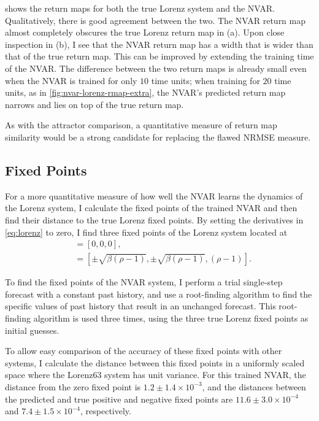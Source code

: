  shows the return maps for both the true
Lorenz system and the NVAR. Qualitatively, there is good agreement
between the two. The NVAR return map almost completely obscures the
true Lorenz return map in (a). Upon close inspection in (b), I see
that the NVAR return map has a width that is wider than that of the
true return map. This can be improved by extending the training time
of the NVAR. The difference between the two return maps is already
small even when the NVAR is trained for only $10$ time units; when
training for $20$ time units, as in \cref{fig:nvar-lorenz-rmap-extra},
the NVAR's predicted return map narrows and lies on top of the true
return map.

As with the attractor comparison, a quantitative measure of return map
similarity would be a strong candidate for replacing the flawed NRMSE
measure.

\subsection{Fixed Points}

For a more quantitative measure of how well the NVAR learns the
dynamics of the Lorenz system, I calculate the fixed points of the
trained NVAR and then find their distance to the true Lorenz fixed
points. By setting the derivatives in \cref{eq:lorenz} to zero, I
find three fixed points of the Lorenz system located at
\begin{align}
  [x, y, z] &= [0, 0, 0], \\
            &= [\pm \sqrt{\beta(\rho - 1)}, \pm \sqrt{\beta(\rho - 1)}, (\rho - 1)].
\end{align}

To find the fixed points of the NVAR system, I perform a trial
single-step forecast with a constant past history, and use a
root-finding algorithm to find the specific values of past history
that result in an unchanged forecast. This root-finding algorithm is
used three times, using the three true Lorenz fixed points as initial
guesses.

To allow easy comparison of the accuracy of these fixed points with
other systems, I calculate the distance between this fixed points in
a uniformly scaled space where the Lorenz63 system has unit
variance. For this trained NVAR, the distance from the zero fixed point
is $1.2\pm1.4\times10^{-3}$, and the distances between the predicted
and true positive and negative fixed points are
$11.6\pm3.0\times10^{-4}$ and $7.4\pm1.5\times10^{-4}$, respectively.

